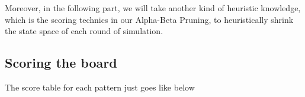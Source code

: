\documentclass[a4paper, 11pt]{article} %
\begin{document}
\begin{multicols}{2}
	Moreover, in the following part, we will take another kind of heuristic knowledge, which is the scoring technics in our Alpha-Beta Pruning, to heuristically shrink the state space of each round of simulation.

	\subsection{Scoring the board}
	
	The score table for each pattern just goes like below
	
	\begin{table}[H]
		\setlength\tabcolsep{3pt}
		\begin{center}
\end{center}
\end{table}
\end{multicols}
\end{document}

